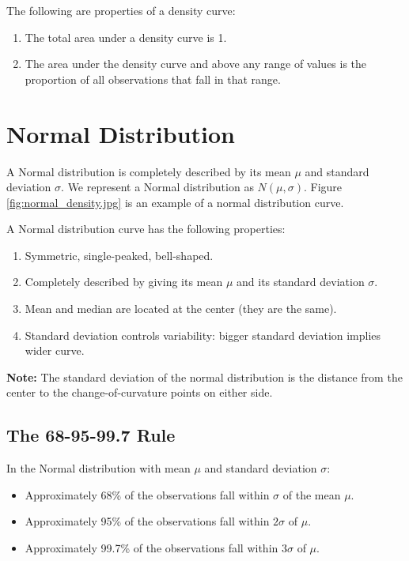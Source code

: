 \vspace{0.5cm}

The following are properties of a density curve:
\begin{enumerate}
    \item The total area under a density curve is 1.
    \item The area under the density curve and above any range of values is the proportion of all observations that fall in that range.
\end{enumerate}


\section{Normal Distribution}
A Normal distribution is completely described by its mean $\mu$ and standard deviation $\sigma$. We represent a Normal distribution as \(N(\mu, \sigma).\) Figure \ref{fig:normal_density.jpg} is an example of a normal distribution curve.

A Normal distribution curve has the following properties:
\begin{enumerate}
    \item Symmetric, single-peaked, bell-shaped.
    \item Completely described by giving its mean $\mu$ and its standard deviation $\sigma$.
    \item Mean and median are located at the center (they are the same).
    \item Standard deviation controls variability: bigger standard deviation implies wider curve.
\end{enumerate}

\textbf{Note:} The standard deviation of the normal distribution is the distance from the center to the change-of-curvature points on either side.


\subsection{The 68-95-99.7 Rule }
In the Normal distribution with mean $\mu$ and standard deviation $\sigma$:

\begin{itemize}
    \item Approximately 68\% of the observations fall within $\sigma$ of the mean $\mu$.
    \item Approximately 95\% of the observations fall within $2\sigma$ of $\mu$.
    \item Approximately 99.7\% of the observations fall within $3\sigma$ of $\mu$.
\end{itemize}

